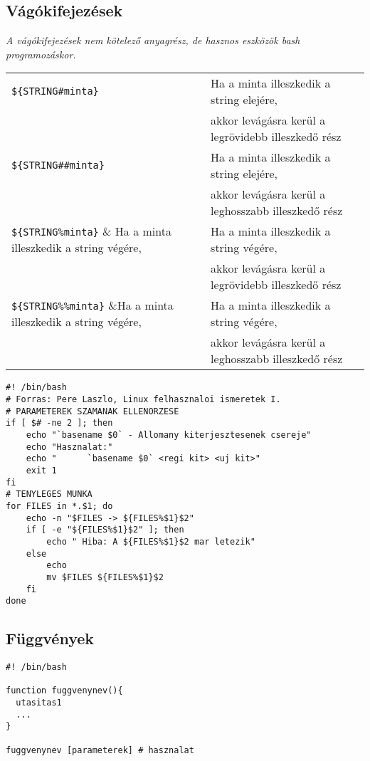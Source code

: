 \subsection{Vágókifejezések}
\emph{A vágókifejezések nem kötelező anyagrész, de hasznos eszközök bash programozáskor.}

\begin{center}
 \begin{tabular}{|ll|}
\hline
\verb.${STRING#minta}.	& Ha a minta illeszkedik a string elejére, \\
			&  akkor levágásra kerül a legrövidebb illeszkedő rész
\\
\hline
\verb.${STRING##minta}.	& Ha a minta illeszkedik a string elejére, \\
			&  akkor levágásra kerül a leghosszabb illeszkedő rész
\\
\hline
\verb.${STRING%minta}. 	& Ha a minta illeszkedik a string végére, \\
			&  akkor levágásra kerül a legrövidebb illeszkedő rész
\\
\hline
\verb.${STRING%%minta}.	&Ha a minta illeszkedik a string végére,\\
			&	akkor levágásra kerül a leghosszabb illeszkedő rész
\\
\hline  
 \end{tabular}
\end{center}
\begin{lstlisting}[title=scriptek/bash/vago.sh]
#! /bin/bash
# Forras: Pere Laszlo, Linux felhasznaloi ismeretek I.
# PARAMETEREK SZAMANAK ELLENORZESE
if [ $# -ne 2 ]; then
	echo "`basename $0` - Allomany kiterjesztesenek csereje"
	echo "Hasznalat:"
	echo "		`basename $0` <regi kit> <uj kit>"
	exit 1
fi
# TENYLEGES MUNKA
for FILES in *.$1; do
	echo -n "$FILES -> ${FILES%$1}$2"
	if [ -e "${FILES%$1}$2" ]; then		
		echo " Hiba: A ${FILES%$1}$2 mar letezik"
	else
		echo
		mv $FILES ${FILES%$1}$2
	fi
done
\end{lstlisting}


\subsection{Függvények}

\begin{lstlisting}
#! /bin/bash

function fuggvenynev(){
  utasitas1
  ...
}

fuggvenynev [parameterek] # hasznalat
\end{lstlisting}

